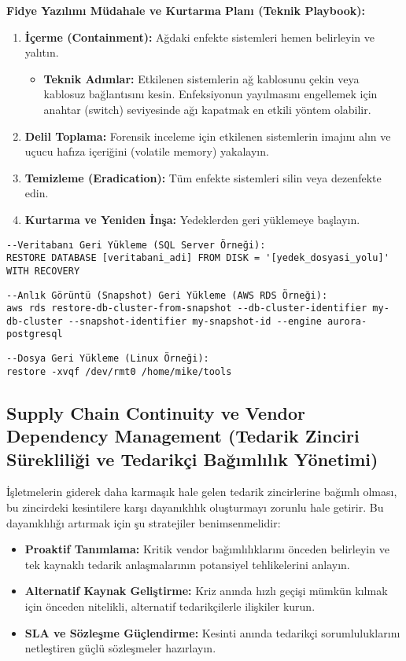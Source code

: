 \textbf{Fidye Yazılımı Müdahale ve Kurtarma Planı (Teknik Playbook):}
\begin{enumerate}
    \item \textbf{İçerme (Containment):} Ağdaki enfekte sistemleri hemen belirleyin ve yalıtın.
    \begin{itemize}
        \item \textbf{Teknik Adımlar:} Etkilenen sistemlerin ağ kablosunu çekin veya kablosuz bağlantısını kesin. Enfeksiyonun yayılmasını engellemek için anahtar (switch) seviyesinde ağı kapatmak en etkili yöntem olabilir.
    \end{itemize}
    \item \textbf{Delil Toplama:} Forensik inceleme için etkilenen sistemlerin imajını alın ve uçucu hafıza içeriğini (volatile memory) yakalayın.
    \item \textbf{Temizleme (Eradication):} Tüm enfekte sistemleri silin veya dezenfekte edin.
    \item \textbf{Kurtarma ve Yeniden İnşa:} Yedeklerden geri yüklemeye başlayın.
\end{enumerate}

\begin{verbatim}
--Veritabanı Geri Yükleme (SQL Server Örneği):
RESTORE DATABASE [veritabani_adi] FROM DISK = '[yedek_dosyasi_yolu]' WITH RECOVERY
\end{verbatim}

\begin{verbatim}
--Anlık Görüntü (Snapshot) Geri Yükleme (AWS RDS Örneği):
aws rds restore-db-cluster-from-snapshot --db-cluster-identifier my-db-cluster --snapshot-identifier my-snapshot-id --engine aurora-postgresql
\end{verbatim}

\begin{verbatim}
--Dosya Geri Yükleme (Linux Örneği):
restore -xvqf /dev/rmt0 /home/mike/tools
\end{verbatim}

\subsection{Supply Chain Continuity ve Vendor Dependency Management (Tedarik Zinciri Sürekliliği ve Tedarikçi Bağımlılık Yönetimi)}

İşletmelerin giderek daha karmaşık hale gelen tedarik zincirlerine bağımlı olması, bu zincirdeki kesintilere karşı dayanıklılık oluşturmayı zorunlu hale getirir. Bu dayanıklılığı artırmak için şu stratejiler benimsenmelidir:
\begin{itemize}
    \item \textbf{Proaktif Tanımlama:} Kritik vendor bağımlılıklarını önceden belirleyin ve tek kaynaklı tedarik anlaşmalarının potansiyel tehlikelerini anlayın.
    \item \textbf{Alternatif Kaynak Geliştirme:} Kriz anında hızlı geçişi mümkün kılmak için önceden nitelikli, alternatif tedarikçilerle ilişkiler kurun.
    \item \textbf{SLA ve Sözleşme Güçlendirme:} Kesinti anında tedarikçi sorumluluklarını netleştiren güçlü sözleşmeler hazırlayın.
\end{itemize}

